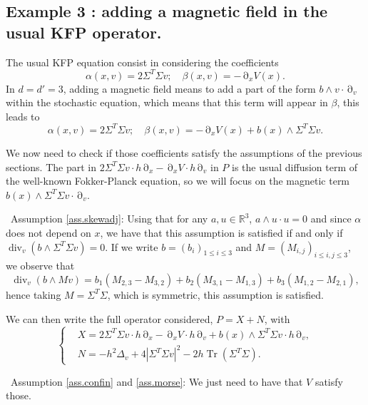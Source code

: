 \documentclass[12pt]{amsart}
\newcommand{\R}{\mathbb R}
\newcommand{\Tr}{{\operatorname{Tr}}}
\renewcommand{\div}{\operatorname{div}}
\numberwithin{equation}{section}
\numberwithin{figure}{section}
\DeclareMathOperator{\p}{\partial}
\begin{document}
\subsection{Example 3 : adding a magnetic field in the usual KFP operator.}\label{ssec:exampleMagnetic}
The usual KFP equation consist in considering the coefficients
\begin{equation*}
\alpha(x,v) = 2\Sigma^T\Sigma v;\quad \beta(x,v) = - \p_xV(x).
\end{equation*}
In $d = d' = 3$, adding a magnetic field means to add a part of the form $b\wedge v\cdot\p_v$ within the stochastic equation, which means that this term will appear in $\beta$, this leads to
\begin{equation*}
\alpha(x,v) = 2\Sigma^T\Sigma v;\quad \beta(x,v) = - \p_xV(x) + b(x)\wedge\Sigma^T\Sigma v.
\end{equation*}

We now need to check if those coefficients satisfy the assumptions of the previous sections. The part in $2\Sigma^T\Sigma v\cdot h\p_x - \p_xV\cdot h\p_v$ in $P$ is the usual diffusion term of the well-known Fokker-Planck equation, so we will focus on the magnetic term $b(x)\wedge\Sigma^T\Sigma v\cdot \p_v$.

\textbullet\ Assumption \ref{ass.skewadj}: Using that for any $a,u\in\R^3$, $a\wedge u\cdot u = 0$ and since $\alpha$ does not depend on $x$, we have that this assumption is satisfied if and only if $\div_v(b\wedge\Sigma^T\Sigma v) = 0$. If we write $b = (b_i)_{1\leq i\leq3}$ and $M = (M_{i,j})_{i\leq i,j\leq3}$, we observe that
\begin{equation*}
\div_v(b\wedge Mv) = b_1(M_{2,3} - M_{3,2}) + b_2(M_{3,1} - M_{1,3}) + b_3(M_{1,2} - M_{2,1}),
\end{equation*}
hence taking $M = \Sigma^T\Sigma$, which is symmetric, this assumption is satisfied.

We can then write the full operator considered, $P = X + N$, with
\begin{equation*}
\left\{
\begin{aligned}
&X = 2\Sigma^T\Sigma v\cdot h\p_x - \p_xV\cdot h\p_v + b(x)\wedge\Sigma^T\Sigma v\cdot h\p_v,\\
&N = -h^2\Delta_v + 4|\Sigma^T\Sigma v|^2 - 2h\Tr(\Sigma^T\Sigma).
\end{aligned}
\right.
\end{equation*}

\textbullet\ Assumption \ref{ass.confin} and \ref{ass.morse}: We just need to have that $V$ satisfy those.
\end{document}
